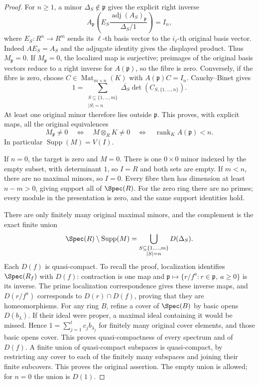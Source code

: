 \begin{proof}
For $n\geq1$, a minor $\Delta_S\notin\mathfrak p$
gives the explicit right inverse
$$
A_{\mathfrak p}
\left(E_S\frac{\operatorname{adj}(A_S)_{\mathfrak p}}
{\Delta_S/1}\right)=I_n,
$$
where $E_S:R^n\to R^m$ sends its $\ell$-th basis
vector to the $i_\ell$-th original basis vector.
Indeed $AE_S=A_S$ and the adjugate identity gives the
displayed product. Thus $M_{\mathfrak p}=0$.
If $M_{\mathfrak p}=0$, the localized map is surjective;
preimages of the original basis vectors reduce to a
right inverse for $A(\mathfrak p)$, so the fibre is zero.
Conversely, if the fibre is zero, choose
$C\in\operatorname{Mat}_{m\times n}(K)$ with
$A(\mathfrak p)C=I_n$. Cauchy--Binet gives
$$
1=\sum_{\substack{S\subseteq\{1,\ldots,m\}\\|S|=n}}
\overline{\Delta_S}\det(C_{S,\{1,\ldots,n\}}).
$$
At least one original minor therefore lies outside
$\mathfrak p$. This proves, with explicit maps, all
the original equivalences
$$
M_{\mathfrak p}\ne0
\quad\Longleftrightarrow\quad
M\otimes_RK\ne0
\quad\Longleftrightarrow\quad
\operatorname{rank}_K A(\mathfrak p)<n.
$$
In particular $\operatorname{Supp}(M)=V(I)$.

If $n=0$, the target is zero and $M=0$. There is one
$0\times0$ minor indexed by the empty subset, with
determinant $1$, so $I=R$ and both sets are empty.
If $m<n$, there are no maximal minors, so $I=0$.
Every fibre then has dimension at least $n-m>0$, giving
support all of $\Spec(R)$. For the zero ring there are
no primes; every module in the presentation is zero,
and the same support identities hold.

There are only finitely many original maximal minors,
and the complement is the exact finite union
$$
\Spec(R)\setminus\operatorname{Supp}(M)
=\bigcup_{\substack{S\subseteq\{1,\ldots,m\}\\|S|=n}}D(\Delta_S).
$$
Each $D(f)$ is quasi-compact. To recall the proof,
localization identifies $\Spec(R_f)$ with $D(f)$:
contraction is one map and
$\mathfrak p\mapsto\{r/f^a:r\in\mathfrak p,\ a\geq0\}$
is its inverse. The prime localization correspondence
gives these inverse maps, and $D(r/f^a)$ corresponds
to $D(r)\cap D(f)$, proving that they are homeomorphisms.
For any ring $B$, refine a cover of $\Spec(B)$ by
basic opens $D(b_\lambda)$. If their ideal were proper,
a maximal ideal containing it would be missed. Hence
$1=\sum_{j=1}^t c_jb_{\lambda_j}$ for finitely many
original cover elements, and those basic opens cover.
This proves quasi-compactness of every spectrum and
of $D(f)$. A finite union of quasi-compact subspaces
is quasi-compact, by restricting any cover to each
of the finitely many subspaces and joining their finite
subcovers. This proves the original assertion. The
empty union is allowed; for $n=0$ the union is $D(1)$.


\end{proof}

